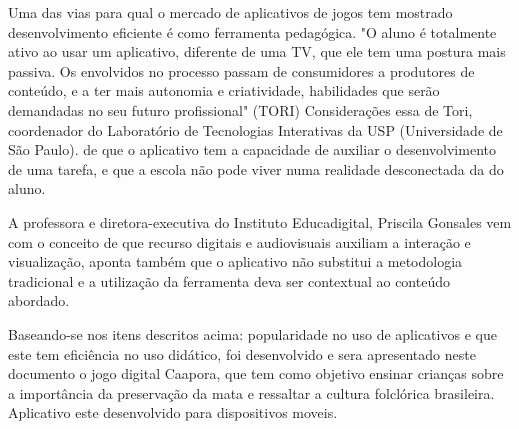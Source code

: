 	
Uma das vias para qual o mercado de aplicativos de jogos tem mostrado desenvolvimento eficiente é como ferramenta pedagógica.
"O aluno é totalmente ativo ao usar um aplicativo, diferente de uma TV, que ele tem uma postura mais passiva. 
Os envolvidos no processo passam de consumidores a produtores de conteúdo, e a ter mais autonomia e criatividade, habilidades que serão demandadas no seu futuro profissional" (TORI)
Considerações essa de Tori, coordenador do Laboratório de Tecnologias Interativas da USP (Universidade de São Paulo).
de que o aplicativo tem a capacidade de auxiliar o desenvolvimento de uma tarefa, e que a escola não pode viver numa realidade desconectada da do aluno.

A professora e diretora-executiva do Instituto Educadigital, Priscila Gonsales vem com o conceito de que recurso digitais
e audiovisuais auxiliam a interação e visualização, aponta também que o aplicativo não substitui a metodologia tradicional e a utilização da ferramenta deva ser contextual ao conteúdo abordado.

Baseando-se nos itens descritos acima: popularidade no uso de aplicativos e que este tem eficiência no uso didático, foi desenvolvido e sera apresentado neste documento o jogo digital Caapora, que tem como objetivo ensinar crianças sobre a importância da preservação da mata e ressaltar a cultura folclórica brasileira.
Aplicativo este desenvolvido para dispositivos moveis.

